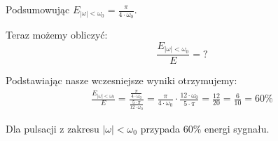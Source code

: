 \begin{task}
Podsumowując $ E_{\left| \omega \right| < \omega_0} = \frac{\pi}{4 \cdot \omega_0}$.

Teraz możemy obliczyć:
\begin{equation}
\frac{E_{\left| \omega \right| < \omega_0}}{E} = ?
\end{equation}

Podstawiając nasze wczesniejsze wyniki otrzymujemy:
\begin{align*}
\frac{E_{\left| \omega \right| < \omega_0}}{E} = \frac{\frac{\pi}{4 \cdot \omega_0}}{\frac{5 \cdot \pi}{12 \cdot \omega_0}} =\frac{\pi}{4 \cdot \omega_0} \cdot \frac{12 \cdot \omega_0}{5 \cdot \pi} =\frac{12}{20} =\frac{6}{10}=60\%
\end{align*}

Dla pulsacji z zakresu $\left| \omega \right| < \omega_0$ przypada $60\%$ energi sygnału.

\end{task}

